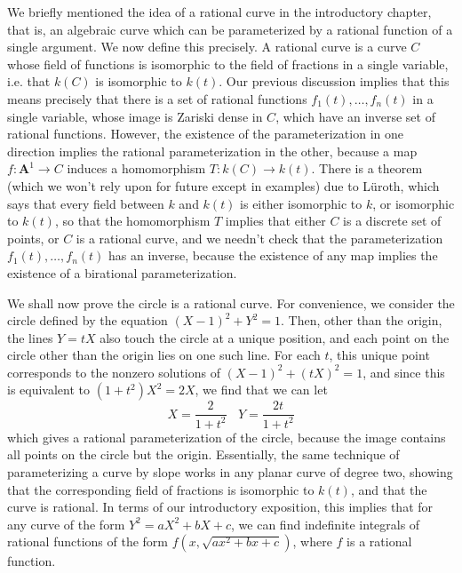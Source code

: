 We briefly mentioned the idea of a rational curve in the introductory chapter, that is, an algebraic curve which can be parameterized by a rational function of a single argument. We now define this precisely. A rational curve is a curve $C$ whose field of functions is isomorphic to the field of fractions in a single variable, i.e. that $k(C)$ is isomorphic to $k(t)$. Our previous discussion implies that this means precisely that there is a set of rational functions $f_1(t), \dots, f_n(t)$ in a single variable, whose image is Zariski dense in $C$, which have an inverse set of rational functions. However, the existence of the parameterization in one direction implies the rational parameterization in the other, because a map $f: \mathbf{A}^1 \to C$ induces a homomorphism $T: k(C) \to k(t)$. There is a theorem (which we won't rely upon for future except in examples) due to L\"{u}roth, which says that every field between $k$ and $k(t)$ is either isomorphic to $k$, or isomorphic to $k(t)$, so that the homomorphism $T$ implies that either $C$ is a discrete set of points, or $C$ is a rational curve, and we needn't check that the parameterization $f_1(t), \dots, f_n(t)$ has an inverse, because the existence of any map implies the existence of a birational parameterization.

\begin{example}
    We shall now prove the circle is a rational curve. For convenience, we consider the circle defined by the equation $(X-1)^2 + Y^2 = 1$. Then, other than the origin, the lines $Y = tX$ also touch the circle at a unique position, and each point on the circle other than the origin lies on one such line. For each $t$, this unique point corresponds to the nonzero solutions of $(X-1)^2 + (tX)^2 = 1$, and since this is equivalent to $(1+t^2)X^2 = 2X$, we find that we can let
    \[ X = \frac{2}{1 + t^2}\ \ \ \ Y = \frac{2t}{1+t^2} \]
    which gives a rational parameterization of the circle, because the image contains all points on the circle but the origin. Essentially, the same technique of parameterizing a curve by slope works in any planar curve of degree two, showing that the corresponding field of fractions is isomorphic to $k(t)$, and that the curve is rational. In terms of our introductory exposition, this implies that for any curve of the form $Y^2 = aX^2 + bX + c$, we can find indefinite integrals of rational functions of the form $f(x,\sqrt{ax^2 + bx + c})$, where $f$ is a rational function.
\end{example}

